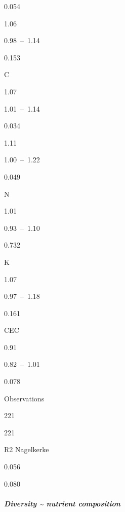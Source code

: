 \documentclass[
]{article}
\begin{document}
0.054

1.06

0.98~--~1.14

0.153

C

1.07

1.01~--~1.14

0.034

1.11

1.00~--~1.22

0.049

N

1.01

0.93~--~1.10

0.732

K

1.07

0.97~--~1.18

0.161

CEC

0.91

0.82~--~1.01

0.078

Observations

221

221

R2 Nagelkerke

0.056

0.080

\hypertarget{diversity-nutrient-composition}{%
\subparagraph{Diversity \textasciitilde{} nutrient
composition}\label{diversity-nutrient-composition}}
\end{document}
